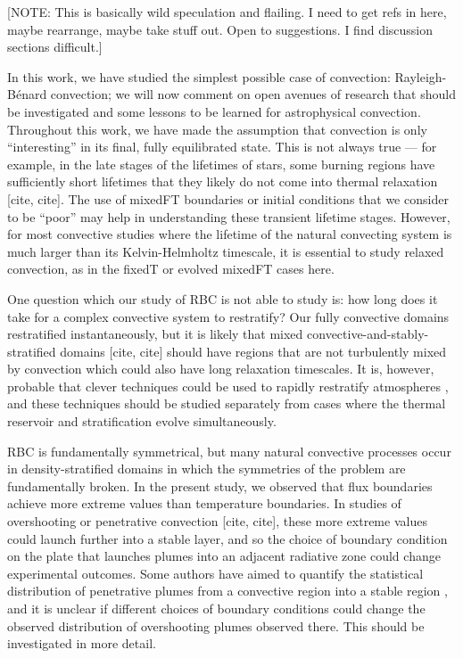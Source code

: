 \documentclass[aps, pre, onecolumn, nofootinbib, notitlepage, groupedaddress, amsfonts, amssymb, amsmath, longbibliography, superscriptaddress]{revtex4-1}
\newcommand{\RB}{Rayleigh-B\'{e}nard }
\begin{document}
[NOTE: This is basically wild speculation and flailing. I need to get refs in here, maybe rearrange, maybe take stuff out. Open to suggestions. I find discussion sections difficult.]

In this work, we have studied the simplest possible case of convection: \RB convection; we will now comment on open avenues of research that should be investigated and some lessons to be learned for astrophysical convection.
Throughout this work, we have made the assumption that convection is only ``interesting'' in its final, fully equilibrated state.
This is not always true --- for example, in the late stages of the lifetimes of stars, some burning regions have sufficiently short lifetimes that they likely do not come into thermal relaxation [cite, cite].
The use of mixedFT boundaries or initial conditions that we consider to be ``poor'' may help in understanding these transient lifetime stages.
However, for most convective studies where the lifetime of the natural convecting system is much larger than its Kelvin-Helmholtz timescale, it is essential to study relaxed convection, as in the fixedT or evolved mixedFT cases here.

One question which our study of RBC is not able to study is: how long does it take for a complex convective system to restratify?
Our fully convective domains restratified instantaneously, but it is likely that mixed convective-and-stably-stratified domains [cite, cite] should have regions that are not turbulently mixed by convection which could also have long relaxation timescales.
It is, however, probable that clever techniques could be used to rapidly restratify atmospheres \cite{anders&all2018}, and these techniques should be studied separately from cases where the thermal reservoir and stratification evolve simultaneously.

RBC is fundamentally symmetrical, but many natural convective processes occur in density-stratified domains in which the symmetries of the problem are fundamentally broken.
In the present study, we observed that flux boundaries achieve more extreme values than temperature boundaries.
In studies of overshooting or penetrative convection [cite, cite], these more extreme values could launch further into a stable layer, and so the choice of boundary condition on the plate that launches plumes into an adjacent radiative zone could change experimental outcomes.
Some authors have aimed to quantify the statistical distribution of penetrative plumes from a convective region into a stable region \cite{pratt&all2017, korre&all2019}, and it is unclear if different choices of boundary conditions could change the observed distribution of overshooting plumes observed there.
This should be investigated in more detail.
\end{document}

